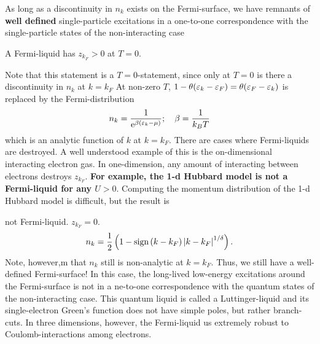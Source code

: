 As long as a discontinuity in $n_k$ exists on the Fermi-surface, we have remnants of \textbf{well defined} single-particle excitations in a one-to-one correspondence with the single-particle states of the non-interacting case
\begin{tcolorbox}
	A Fermi-liquid has $z_{k_F} > 0 $ at $T = 0$.
\end{tcolorbox} 
Note that this statement is a $T=0$-statement, since only at $T =0$ is there a discontinuity in $n_k$ at $k = k_F$
At non-zero $T$, $ 1-\theta(\varepsilon_k - \varepsilon_F) = \theta(\varepsilon_F-\varepsilon_k) $ is replaced by the Fermi-distribution
\begin{equation}
n_k = \frac{1}{\mathrm{e}^{\beta(\varepsilon_k-\mu)}} ; \quad \beta = \frac{1}{k_B T}
\end{equation}
which is an analytic function of $k$ at $k=k_F$.
There are cases where Fermi-liquids are destroyed. A well understood example of this is the on-dimensional interacting electron gas.
In one-dimension, any amount of interacting between electrons destroys $z_{k_F}$. \textbf{For example, the 1-d Hubbard model is not a Fermi-liquid for any $U>0$}. Computing the momentum distribution of the 1-d Hubbard model is difficult, but the result is 
\begin{center}
\end{center}
not Fermi-liquid. $z_{k_F} = 0$. 
\begin{equation}
n_k=\frac{1}{2}\left(1-\text{sign}\left(k-k_{F}\right)\left|k-k_{F}\right|^{1 / \delta}\right).
\end{equation}
Note, however,m that $n_k$ still is non-analytic at $k=k_F$. Thus, we still have a well-defined Fermi-surface!
In this case, the long-lived low-energy excitations around the Fermi-surface is not in a ne-to-one correspondence with the quantum states of the non-interacting case. This quantum liquid is called a Luttinger-liquid and its single-electron Green's function does not have simple poles, but rather branch-cuts. 
In three dimensions, however, the Fermi-liquid us extremely robust to Coulomb-interactions among electrons. 


